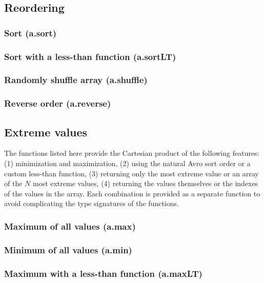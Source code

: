 \documentclass{article}
\theoremstyle{definition}
\begin{document}
\subsection{Reordering}

\subsubsection{Sort (a.sort)}

\subsubsection{Sort with a less-than function (a.sortLT)}

\subsubsection{Randomly shuffle array (a.shuffle)}

\subsubsection{Reverse order (a.reverse)}

\subsection{Extreme values}

The functions listed here provide the Cartesian product of the following features: (1) minimization and maximization, (2) using the natural Avro sort order or a custom less-than function, (3) returning only the most extreme value or an array of the $N$ most extreme values, (4) returning the values themselves or the indexes of the values in the array.  Each combination is provided as a separate function to avoid complicating the type signatures of the functions.

\subsubsection{Maximum of all values (a.max)}

\subsubsection{Minimum of all values (a.min)}

\subsubsection{Maximum with a less-than function (a.maxLT)}
\end{document}

